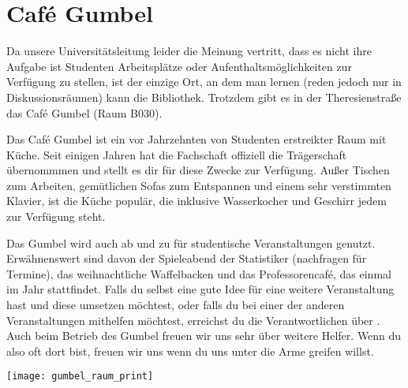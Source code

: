 ﻿
\chapter{Café Gumbel}

Da unsere Universitätsleitung leider die Meinung vertritt, dass es nicht ihre
Aufgabe ist Studenten  Arbeitsplätze oder Aufenthaltsmöglichkeiten zur Verfügung
zu stellen, ist der einzige Ort, an dem man lernen (reden jedoch nur in
Diskussionsräumen) kann die Bibliothek. Trotzdem gibt es in der Theresienstraße
das Café Gumbel (Raum B030).

Das Café Gumbel ist ein vor Jahrzehnten von Studenten erstreikter Raum mit
Küche. Seit einigen Jahren hat die Fachschaft offiziell die Trägerschaft
übernommmen und stellt es dir für diese Zwecke zur Verfügung. Außer
Tischen zum Arbeiten, gemütlichen Sofas zum Entspannen und einem sehr
verstimmten Klavier, ist die Küche populär, die inklusive Wasserkocher und
Geschirr jedem zur Verfügung steht.

Das Gumbel wird auch ab und zu für studentische Veranstaltungen genutzt.
Erwähnenswert sind davon der Spieleabend der Statistiker (nachfragen für
Termine), das weihnachtliche Waffelbacken und das Professorencafé, das einmal
im Jahr stattfindet.  Falls du selbst eine gute Idee für eine weitere
Veranstaltung hast und diese umsetzen möchtest, oder falls du bei einer der anderen
Veranstaltungen mithelfen möchtest, erreichst du die Verantwortlichen über
. Auch beim Betrieb des Gumbel freuen wir uns sehr über
weitere Helfer. Wenn du also oft dort bist, freuen wir uns wenn du uns unter
die Arme greifen willst.

\skiptobottom
\begin{center}
     \texttt{[image: gumbel\_raum\_print]}
\end{center}
